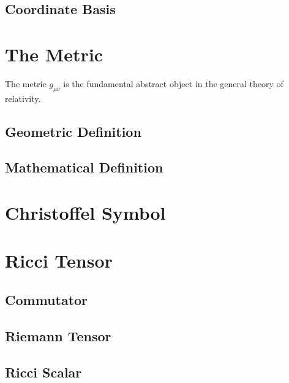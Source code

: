 \subsection{Coordinate Basis}
\label{subsec:coordinate-basis}

\section{The Metric}
\label{sec:metric}

The metric $g_{\mu \nu}$ is the fundamental abstract object in the general 
theory of relativity. 

\subsection{Geometric Definition}
\label{subsec:geo-def-metric}

\subsection{Mathematical Definition}
\label{subsec:math-def-metric}

\section{Christoffel Symbol}
\label{sec:christoffel}

\section{Ricci Tensor}
\label{sec:ricci-tensor}

\subsection{Commutator}
\label{subsec:commutator}

\subsection{Riemann Tensor}
\label{subsec:riemann-tensor}

\subsection{Ricci Scalar}
\label{subsec:ricci-scalar}




